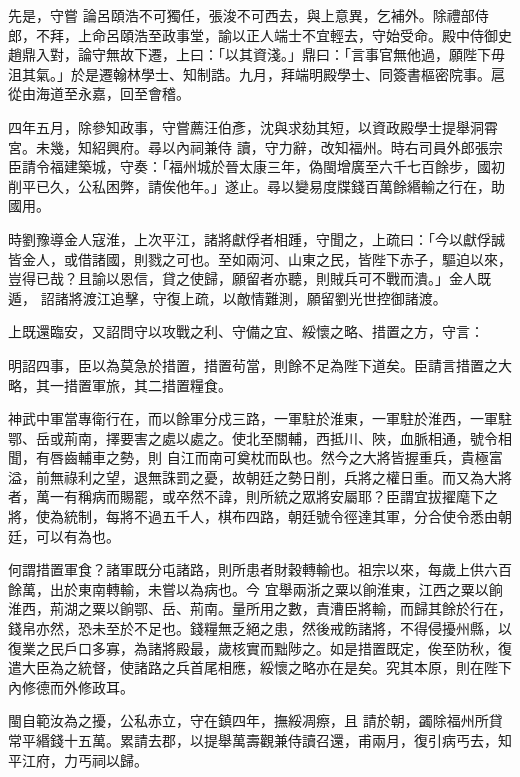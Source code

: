 \begin{pinyinscope}
 先是，守嘗
 論呂頤浩不可獨任，張浚不可西去，與上意異，乞補外。除禮部侍郎，不拜，上命呂頤浩至政事堂，諭以正人端士不宜輕去，守始受命。殿中侍御史趙鼎入對，論守無故下遷，上曰：「以其資淺。」鼎曰：「言事官無他過，願陛下毋沮其氣。」於是遷翰林學士、知制誥。九月，拜端明殿學士、同簽書樞密院事。扈從由海道至永嘉，回至會稽。



 四年五月，除參知政事，守嘗薦汪伯彥，沈與求劾其短，以資政殿學士提舉洞霄宮。未幾，知紹興府。尋以內祠兼侍
 讀，守力辭，改知福州。時右司員外郎張宗臣請令福建築城，守奏：「福州城於晉太康三年，偽閩增廣至六千七百餘步，國初削平已久，公私困弊，請俟他年。」遂止。尋以變易度牒錢百萬餘緡輸之行在，助國用。



 時劉豫導金人寇淮，上次平江，諸將獻俘者相踵，守聞之，上疏曰：「今以獻俘誠皆金人，或借諸國，則戮之可也。至如兩河、山東之民，皆陛下赤子，驅迫以來，豈得已哉？且諭以恩信，貸之使歸，願留者亦聽，則賊兵可不戰而潰。」金人既遁，
 詔諸將渡江追擊，守復上疏，以敵情難測，願留劉光世控御諸渡。



 上既還臨安，又詔問守以攻戰之利、守備之宜、綏懷之略、措置之方，守言：



 明詔四事，臣以為莫急於措置，措置茍當，則餘不足為陛下道矣。臣請言措置之大略，其一措置軍旅，其二措置糧食。



 神武中軍當專衛行在，而以餘軍分戍三路，一軍駐於淮東，一軍駐於淮西，一軍駐鄂、岳或荊南，擇要害之處以處之。使北至關輔，西抵川、陜，血脈相通，號令相聞，有唇齒輔車之勢，則
 自江而南可奠枕而臥也。然今之大將皆握重兵，貴極富溢，前無祿利之望，退無誅罰之憂，故朝廷之勢日削，兵將之權日重。而又為大將者，萬一有稱病而賜罷，或卒然不諱，則所統之眾將安屬耶？臣謂宜拔擢麾下之將，使為統制，每將不過五千人，棋布四路，朝廷號令徑達其軍，分合使令悉由朝廷，可以有為也。



 何謂措置軍食？諸軍既分屯諸路，則所患者財穀轉輸也。祖宗以來，每歲上供六百餘萬，出於東南轉輸，未嘗以為病也。今
 宜舉兩浙之粟以餉淮東，江西之粟以餉淮西，荊湖之粟以餉鄂、岳、荊南。量所用之數，責漕臣將輸，而歸其餘於行在，錢帛亦然，恐未至於不足也。錢糧無乏絕之患，然後戒飭諸將，不得侵擾州縣，以復業之民戶口多寡，為諸將殿最，歲核實而黜陟之。如是措置既定，俟至防秋，復遣大臣為之統督，使諸路之兵首尾相應，綏懷之略亦在是矣。究其本原，則在陛下內修德而外修政耳。



 閩自範汝為之擾，公私赤立，守在鎮四年，撫綏凋瘵，且
 請於朝，蠲除福州所貸常平緡錢十五萬。累請去郡，以提舉萬壽觀兼侍讀召還，甫兩月，復引病丐去，知平江府，力丐祠以歸。




\end{pinyinscope}
